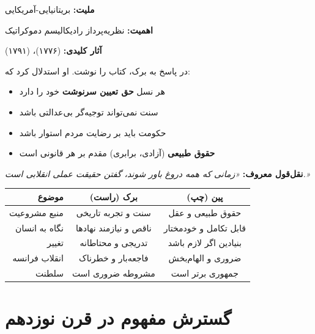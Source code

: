 \vspace{15pt}

\begin{personbox}

\textbf{ملیت:} بریتانیایی-آمریکایی

\textbf{اهمیت:} نظریه‌پرداز رادیکالیسم دموکراتیک

\textbf{آثار کلیدی:}  (۱۷۷۶)،  (۱۷۹۱)

\mediumspace

 در پاسخ به برک، کتاب  را نوشت. او استدلال کرد که:

\begin{itemize}[nosep, rightmargin=0.5cm]
    \item هر نسل \textbf{حق تعیین سرنوشت} خود را دارد
    \item سنت نمی‌تواند توجیه‌گر بی‌عدالتی باشد
    \item حکومت باید بر رضایت مردم استوار باشد
    \item \textbf{حقوق طبیعی} (آزادی، برابری) مقدم بر هر قانونی است
\end{itemize}

\mediumspace

\textbf{نقل‌قول معروف:} \textit{«زمانی که همه دروغ باور شوند، گفتن حقیقت عملی انقلابی است.»}
\end{personbox}

\begin{comparebox}
\begin{table}[H]
\centering
\begin{tabular}{r|c|c}
\toprule
\textbf{موضوع} & \textbf{برک (راست)} & \textbf{پین (چپ)} \\
\midrule
منبع مشروعیت & سنت و تجربه تاریخی & حقوق طبیعی و عقل \\
نگاه به انسان & ناقص و نیازمند نهادها & قابل تکامل و خودمختار \\
تغییر & تدریجی و محتاطانه & بنیادین اگر لازم باشد \\
انقلاب فرانسه & فاجعه‌بار و خطرناک & ضروری و الهام‌بخش \\
سلطنت & مشروطه ضروری است & جمهوری برتر است \\
\bottomrule
\end{tabular}
\end{table}
\end{comparebox}

\section{گسترش مفهوم در قرن نوزدهم}

